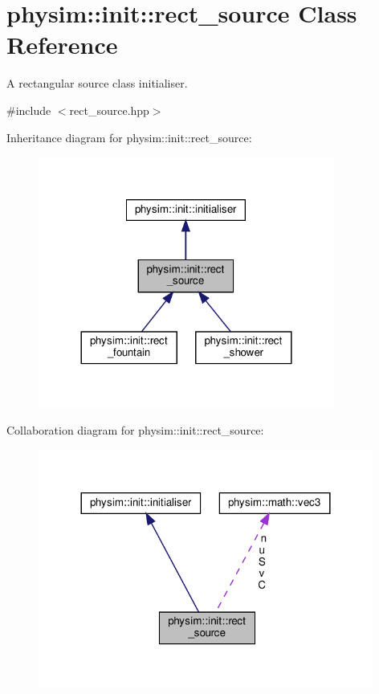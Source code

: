 \hypertarget{classphysim_1_1init_1_1rect__source}{}\section{physim\+:\+:init\+:\+:rect\+\_\+source Class Reference}
\label{classphysim_1_1init_1_1rect__source}


A rectangular source class initialiser.  




{\ttfamily \#include $<$rect\+\_\+source.\+hpp$>$}



Inheritance diagram for physim\+:\+:init\+:\+:rect\+\_\+source\+:\nopagebreak
\begin{figure}[H]
\begin{center}
\leavevmode
\includegraphics[width=276pt]{classphysim_1_1init_1_1rect__source__inherit__graph}
\end{center}
\end{figure}


Collaboration diagram for physim\+:\+:init\+:\+:rect\+\_\+source\+:\nopagebreak
\begin{figure}[H]
\begin{center}
\leavevmode
\includegraphics[width=312pt]{classphysim_1_1init_1_1rect__source__coll__graph}
\end{center}
\end{figure}
